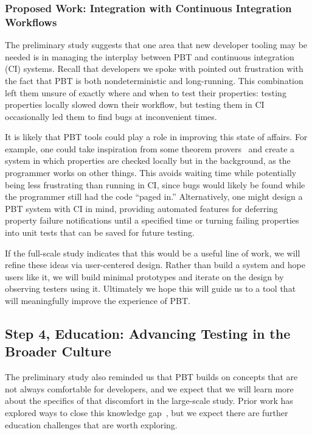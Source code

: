 \subsubsection{Proposed Work: Integration with Continuous Integration Workflows}

The preliminary study suggests that one area that new developer tooling may be
needed is in managing the interplay between PBT and continuous integration (CI)
systems. Recall that developers we spoke with pointed out frustration with the
fact that PBT is both nondeterministic and long-running. This combination left
them unsure of exactly where and when to test their properties: testing
properties locally slowed down their workflow, but testing them in CI
occasionally led them to find bugs at inconvenient times.

It is likely that PBT tools could play a role in improving this state of
affairs. For example, one could take inspiration from some theorem
provers~\cite{berghofer2004random} and create a system in which properties are
checked locally but in the background, as the programmer works on other things.
This avoids waiting time while potentially being less frustrating than running
in CI, since bugs would likely be found while the programmer still had the code
``paged in.'' Alternatively, one might design a PBT system with CI in mind,
providing automated features for deferring property failure notifications until
a specified time or turning failing properties into unit tests that can be saved
for future testing.

If the full-scale study indicates that this would be a useful line of work, we
will refine these ideas via user-centered design. Rather than build a system and
hope users like it, we will build minimal prototypes and iterate on the design
by observing testers using it. Ultimately we hope this will guide us to a tool
that will meaningfully improve the experience of PBT.

\subsection{Step 4, Education: Advancing Testing in the Broader Culture }\label{sec:ed}

The preliminary study also reminded us that PBT builds on concepts that are not
always comfortable for developers, and we expect that we will learn more about
the specifics of that discomfort in the large-scale study.  Prior work has
explored ways to close this knowledge
gap~\cite{wrenn2021using,nelson2021automated}, but we expect there are further
education challenges that are worth exploring.

